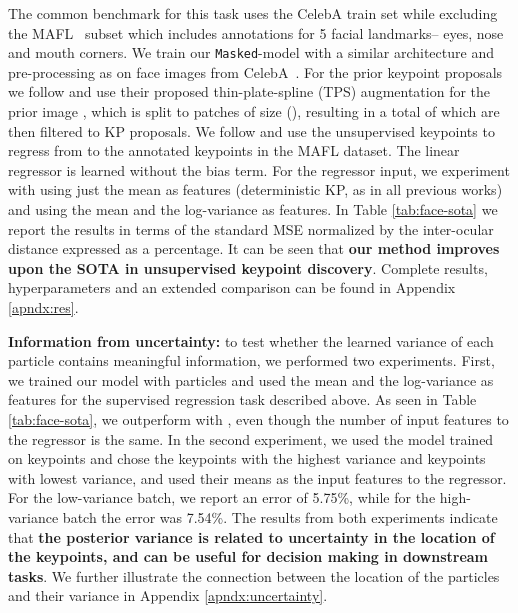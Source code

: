 \documentclass[nohyperref]{article}
\theoremstyle{plain}
\theoremstyle{definition}
\theoremstyle{remark}
\begin{document}
The common benchmark for this task uses the CelebA train set while excluding the MAFL~\citep{zhang2014facial} subset which includes annotations for 5 facial landmarks-- eyes, nose and mouth corners.
We train our \texttt{Masked}-model with a similar architecture and pre-processing as \citet{jakab2018unsupervised} on  face images from CelebA~\citep{liu2015faceattributes}. For the prior keypoint proposals we follow \citet{jakab2018unsupervised} and use their proposed thin-plate-spline (TPS) augmentation for the prior image , which is split to patches of size  (), resulting in a total of  which are then filtered to  KP proposals. We follow \citet{thewlis2017unsupervised1, thewlis2017unsupervised2, jakab2018unsupervised} and use the unsupervised keypoints to regress from  to the annotated keypoints in the MAFL dataset. The linear regressor is learned without the bias term. For the regressor input, we experiment with using just the mean  as features (deterministic KP, as in all previous works) and using the mean  and the log-variance  as features. In Table \ref{tab:face-sota} we report the results in terms of the standard MSE normalized by the inter-ocular distance expressed as a percentage. It can be seen that \textbf{our method improves upon the SOTA in unsupervised keypoint discovery}.
Complete results, hyperparameters and an extended comparison can be found in Appendix \ref{apndx:res}.

\textbf{Information from uncertainty:} to test whether the learned variance of each particle contains meaningful information, we performed two experiments. First, we trained our model with  particles and used the mean  and the log-variance  as features for the supervised regression task described above. As seen in Table \ref{tab:face-sota}, we outperform \citet{jakab2018unsupervised} with , even though the number of input features to the regressor is the same. In the second experiment, we used the model trained on  keypoints and chose the  keypoints with the highest variance and  keypoints with lowest variance, and used their means  as the input features to the regressor. For the low-variance batch, we report an error of 5.75\%, while for the high-variance batch the error was 7.54\%. The results from both experiments indicate that \textbf{the posterior variance is related to uncertainty in the location of the keypoints, and can be useful for decision making in downstream tasks}. We further illustrate the connection between the location of the particles and their variance in Appendix \ref{apndx:uncertainty}. 
\end{document}
